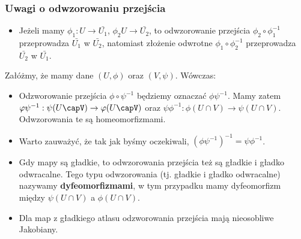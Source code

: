 \subsubsection{Uwagi o odwzorowaniu przejścia}
\begin{itemize}
	\item Jeżeli mamy $\phi_1 : U \to \bar{U_1}$, $\phi_2 U \to \bar{U_2}$, to odwzorowanie przejścia $\phi_2 \circ \phi_1^{-1}$ przeprowadza $\bar{U_1}$ w $\bar{U_2}$, natomiast złożenie odwrotne $\phi_1 \circ \phi_2^{-1}$ przeprowadza $\bar{U_2}$ w $\bar{U_1}$.
\end{itemize}
Załóżmy, że mamy dane $(U,\phi)$ oraz $(V,\psi)$. Wówczas:
\begin{itemize}
	\item Odzworowanie przejścia $\phi \circ \psi^{-1}$ będziemy oznaczać $\phi\psi^{-1}$. Mamy zatem $\phi\psi^{-1} : \psi(U\capV) \to \phi(U\capV)$ oraz $\psi\phi^{-1} : \phi(U\cap V) \to \psi(U \cap V)$. Odwzorowania te są homeomorfizmami.
	\item Warto zauważyć, że tak jak byśmy oczekiwali, $\left(\phi\psi^{-1}\right)^{-1} = \psi\phi^{-1}$.
	\item Gdy mapy są gładkie, to odwzorowania przejścia też są gładkie i gładko odwracalne. Tego typu odwzorowania (tj. gładkie i gładko odwracalne) nazywamy \textbf{dyfeomorfizmami}, w tym przypadku mamy dyfeomorfizm między $\psi(U\cap V)$ a $\phi(U \cap V)$.
	\item Dla map z gładkiego atlasu odzworowania przejścia mają nieosobliwe Jakobiany.
\end{itemize}
